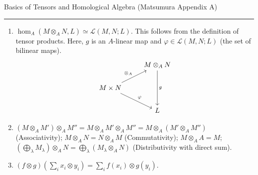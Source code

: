 \begin{notes}
      Basics of Tensors and Homological Algebra (Matsumura Appendix A)
\end{notes}
\hrule

\begin{enumerate}
      \item
            $\hom_A(M\otimes_A N,L)\simeq\mathscr{L}(M,N;L)$. This follows from the definition of tensor products.
            Here, $g$ is an $A$-linear map and $\varphi \in \mathscr{L}(M,N;L)$ (the set of bilinear maps).
            \begin{equation*}
                  \begin{tikzcd}[]
                        & M \otimes_A N \arrow[dd,"g"] \\
                        M \times N \arrow[ur, "\otimes_A"] \ar[dr, "\varphi"] &\\
                        & L
                  \end{tikzcd}
            \end{equation*}
      \item
            $(M\otimes_A M')\otimes_A M''=M\otimes_A M'\otimes_A M''=M\otimes_A(M'\otimes_A M'')$ (Associativity);
            $M\otimes_A N =N \otimes_A M$ (Commutativity); $M\otimes_A A = M$;
            $(\bigoplus_\lambda M_\lambda)\otimes_A N=\bigoplus_\lambda(M_\lambda\otimes_A N)$
            (Distributivity with direct sum).
      \item $(f\otimes g)(\sum_i{x_i\otimes y_i})=\sum_i{f(x_i)\otimes g(y_i)}$.
\end{enumerate}